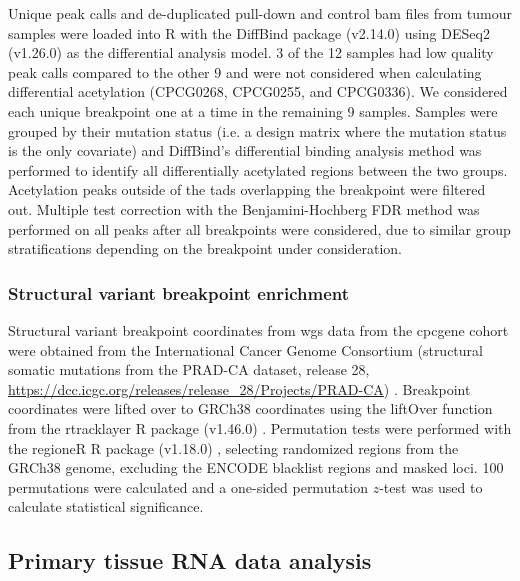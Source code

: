 Unique peak calls and de-duplicated pull-down and control \gls{bam} files from tumour samples were loaded into R with the DiffBind package (v2.14.0) \cite{starkDiffBindDifferentialBinding2011} using DESeq2 (v1.26.0) \cite{loveModeratedEstimationFold2014} as the differential analysis model.
3 of the 12 samples had low quality peak calls compared to the other 9 and were not considered when calculating differential acetylation (CPCG0268, CPCG0255, and CPCG0336).
We considered each unique breakpoint one at a time in the remaining 9 samples.
Samples were grouped by their mutation status (i.e. a design matrix where the mutation status is the only covariate) and DiffBind's differential binding analysis method was performed to identify all differentially acetylated regions between the two groups.
Acetylation peaks outside of the \glspl{tad} overlapping the breakpoint were filtered out.
Multiple test correction with the Benjamini-Hochberg FDR method \cite{benjaminiControllingFalseDiscovery1995} was performed on all peaks after all breakpoints were considered, due to similar group stratifications depending on the breakpoint under consideration.

\subsubsection{Structural variant breakpoint enrichment}

Structural variant breakpoint coordinates from \gls{wgs} data from the \gls{cpcgene} cohort were obtained from the International Cancer Genome Consortium (structural somatic mutations from the PRAD-CA dataset, release 28, \url{https://dcc.icgc.org/releases/release_28/Projects/PRAD-CA}) \cite{zhangInternationalCancerGenome2019}.
Breakpoint coordinates were lifted over to GRCh38 coordinates using the liftOver function from the rtracklayer R package (v1.46.0) \cite{lawrenceRtracklayerPackageInterfacing2009}.
Permutation tests were performed with the regioneR R package (v1.18.0) \cite{gelRegioneRBioconductorPackage2015}, selecting randomized regions from the GRCh38 genome, excluding the ENCODE blacklist regions \cite{amemiyaENCODEBlacklistIdentification2019} and masked loci.
100 permutations were calculated and a one-sided permutation $z$-test was used to calculate statistical significance.

\subsection{Primary tissue RNA data analysis}


